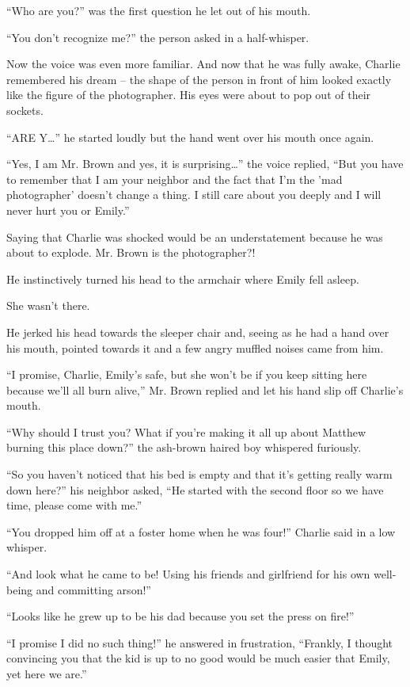 “Who are you?” was the first question he let out of his mouth.

“You don't recognize me?” the person asked in a half-whisper.

Now the voice was even more familiar. And now that he was fully awake, Charlie remembered his dream – the shape of the person in front of him looked exactly like the figure of the photographer. His eyes were about to pop out of their sockets.

“ARE Y…” he started loudly but the hand went over his mouth once again.

“Yes, I am Mr. Brown and yes, it is surprising…” the voice replied, “But you have to remember that I am your neighbor and the fact that I'm the 'mad photographer' doesn't change a thing. I still care about you deeply and I will never hurt you or Emily.”

Saying that Charlie was shocked would be an understatement because he was about to explode. Mr. Brown is the photographer?!

He instinctively turned his head to the armchair where Emily fell asleep.

She wasn't there.

He jerked his head towards the sleeper chair and, seeing as he had a hand over his mouth, pointed towards it and a few angry muffled noises came from him.

“I promise, Charlie, Emily's safe, but she won't be if you keep sitting here because we'll all burn alive,” Mr. Brown replied and let his hand slip off Charlie's mouth.

“Why should I trust you? What if you're making it all up about Matthew burning this place down?” the ash-brown haired boy whispered furiously.

“So you haven't noticed that his bed is empty and that it's getting really warm down here?” his neighbor asked, “He started with the second floor so we have time, please come with me.”

“You dropped him off at a foster home when he was four!” Charlie said in a low whisper.

“And look what he came to be! Using his friends and girlfriend for his own well-being and committing arson!”

“Looks like he grew up to be his dad because you set the press on fire!”

“I promise I did no such thing!” he answered in frustration, “Frankly, I thought convincing you that the kid is up to no good would be much easier that Emily, yet here we are.”

